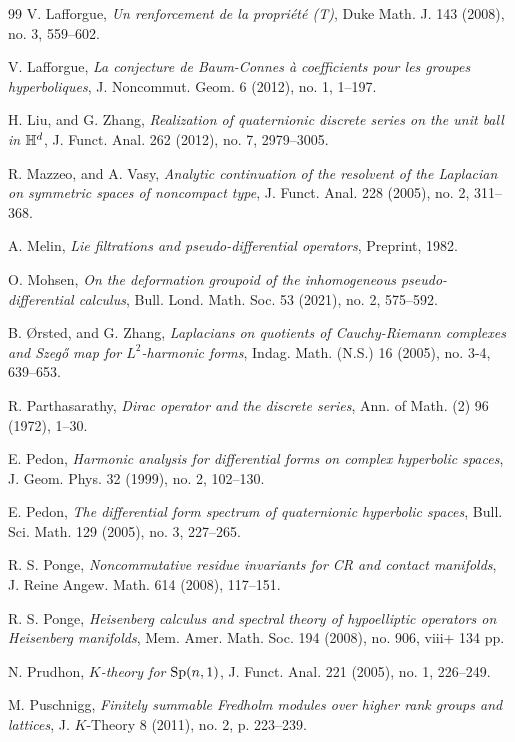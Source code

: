 \documentclass[a4paper,reqno]{amsart}
\numberwithin{equation}{section}
\theoremstyle{definition}
\theoremstyle{remark}
\begin{document}
\begin{thebibliography}{99}
 V. Lafforgue, \emph{Un renforcement de la propriété (T)}, Duke Math. J. 143 (2008), no. 3, 559--602. 

 V. Lafforgue, \emph{ La conjecture de Baum-Connes à coefficients pour les groupes hyperboliques}, J. Noncommut. Geom. 6 (2012), no. 1, 1--197.

 H. Liu, and G. Zhang, \emph{Realization of quaternionic discrete series on the unit ball in $\Bbb H^d$}, J. Funct. Anal. 262 (2012), no. 7, 2979--3005. 

 R. Mazzeo, and A. Vasy, \emph{Analytic continuation of the resolvent of the Laplacian on symmetric spaces of noncompact type}, J. Funct. Anal. 228 (2005), no. 2, 311--368.

 A. Melin, \emph{Lie filtrations and pseudo-differential operators}, Preprint, 1982.

 O. Mohsen, \emph{On the deformation groupoid of the inhomogeneous pseudo-differential calculus}, Bull. Lond. Math. Soc. 53 (2021), no. 2, 575--592. 

 B. Ørsted, and G. Zhang, \emph{Laplacians on quotients of Cauchy-Riemann complexes and Szegő map for $L^2$-harmonic forms}, Indag. Math. (N.S.) 16 (2005), no. 3-4, 639--653.


 R. Parthasarathy, \emph{Dirac operator and the discrete series}, Ann. of Math. (2) 96 (1972), 1--30. 

 E. Pedon, \emph{Harmonic analysis for differential forms on complex hyperbolic spaces}, J. Geom. Phys. 32 (1999), no. 2, 102--130.

 E. Pedon, \emph{The differential form spectrum of quaternionic hyperbolic spaces}, Bull. Sci. Math. 129 (2005), no. 3, 227--265. 

 R. S. Ponge, \emph{Noncommutative residue invariants for CR and contact manifolds}, J. Reine Angew. Math. 614 (2008), 117--151.

 R. S. Ponge, \emph{Heisenberg calculus and spectral theory of hypoelliptic operators on Heisenberg manifolds}, Mem. Amer. Math. Soc. 194 (2008), no. 906, viii+ 134 pp. 

 N. Prudhon, \emph{$K$-theory for ${\rm Sp}(n,1)$}, J. Funct. Anal. 221 (2005), no. 1, 226--249.


 M. Puschnigg, \emph{Finitely summable Fredholm modules over higher rank groups and lattices}, J. $K$-Theory 8 (2011), no. 2, p. 223--239. 


\end{thebibliography}
\end{document}
